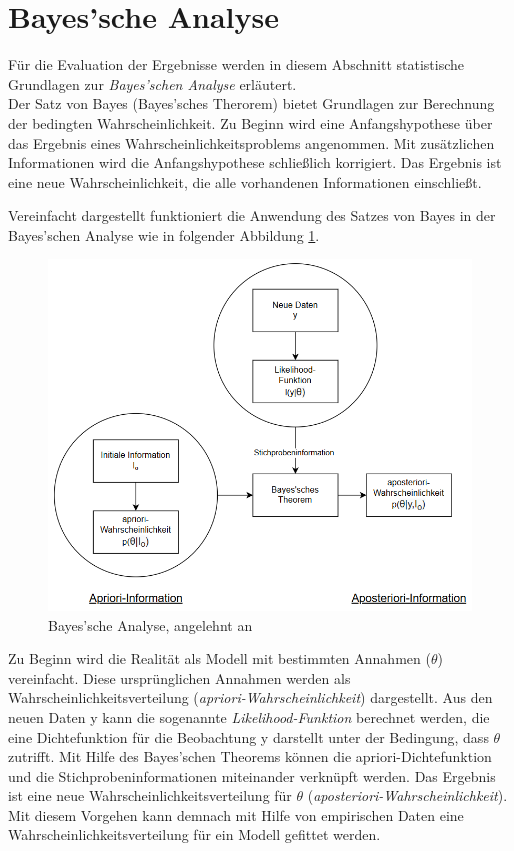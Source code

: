 \section{Bayes'sche Analyse}
\label{sec:bayesian}

Für die Evaluation der Ergebnisse werden in diesem Abschnitt statistische Grundlagen zur \emph{Bayes'schen Analyse} erläutert.\\
Der Satz von Bayes (Bayes'sches Therorem) bietet Grundlagen zur Berechnung der bedingten Wahrscheinlichkeit.
Zu Beginn wird eine Anfangshypothese über das Ergebnis eines Wahrscheinlichkeitsproblems angenommen.
Mit zusätzlichen Informationen wird die Anfangshypothese schließlich korrigiert.
Das Ergebnis ist eine neue Wahrscheinlichkeit, die alle vorhandenen Informationen einschließt. \cite{peyrolon_definition_2020}

Vereinfacht dargestellt funktioniert die Anwendung des Satzes von Bayes in der Bayes'schen Analyse wie in folgender Abbildung \ref{fig:bayesianInference}.

\begin{figure}[H]
	\centering
	\includegraphics[scale = 0.8]{Bilder/bayesianInterence.png}
	\caption{Bayes'sche Analyse, angelehnt an \cite{nenning_bayessche_1980}}
	\label{fig:bayesianInference}
\end{figure}

Zu Beginn wird die Realität als Modell mit bestimmten Annahmen ($\theta$) vereinfacht.
Diese ursprünglichen Annahmen werden als Wahrscheinlichkeitsverteilung (\emph{apriori-Wahr\-schein\-lich\-keit}) dargestellt. 
Aus den neuen Daten y kann die sogenannte
\emph{Likelihood-Funktion} berechnet werden, die eine Dichtefunktion für die Beobachtung y darstellt unter der Bedingung, dass $\theta$ zutrifft.
Mit Hilfe des Bayes'schen Theorems können die apriori-Dich\-te\-funk\-tion und die Stichprobeninformationen miteinander verknüpft werden.
Das Ergebnis ist eine neue Wahrscheinlichkeitsverteilung für $\theta$ (\emph{aposteriori-Wahrscheinlichkeit}). \cite{nenning_bayessche_1980}
Mit diesem Vorgehen kann demnach mit Hilfe von empirischen Daten eine Wahrscheinlichkeitsverteilung für ein Modell gefittet werden.

